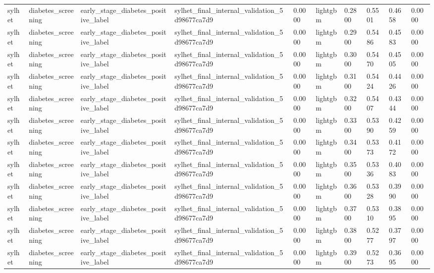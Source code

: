 \begin{tabular}{llllllllll}
sylhet & diabetes\_screening & early\_stage\_diabetes\_positive\_label & sylhet\_final\_internal\_validation\_5d98677ca7d9 & 0.0000 & lightgbm & 0.2800 & 0.5501 & 0.4658 & 0.0000 \\
sylhet & diabetes\_screening & early\_stage\_diabetes\_positive\_label & sylhet\_final\_internal\_validation\_5d98677ca7d9 & 0.0000 & lightgbm & 0.2900 & 0.5486 & 0.4583 & 0.0000 \\
sylhet & diabetes\_screening & early\_stage\_diabetes\_positive\_label & sylhet\_final\_internal\_validation\_5d98677ca7d9 & 0.0000 & lightgbm & 0.3000 & 0.5470 & 0.4505 & 0.0000 \\
sylhet & diabetes\_screening & early\_stage\_diabetes\_positive\_label & sylhet\_final\_internal\_validation\_5d98677ca7d9 & 0.0000 & lightgbm & 0.3100 & 0.5424 & 0.4426 & 0.0000 \\
sylhet & diabetes\_screening & early\_stage\_diabetes\_positive\_label & sylhet\_final\_internal\_validation\_5d98677ca7d9 & 0.0000 & lightgbm & 0.3200 & 0.5407 & 0.4344 & 0.0000 \\
sylhet & diabetes\_screening & early\_stage\_diabetes\_positive\_label & sylhet\_final\_internal\_validation\_5d98677ca7d9 & 0.0000 & lightgbm & 0.3300 & 0.5390 & 0.4259 & 0.0000 \\
sylhet & diabetes\_screening & early\_stage\_diabetes\_positive\_label & sylhet\_final\_internal\_validation\_5d98677ca7d9 & 0.0000 & lightgbm & 0.3400 & 0.5373 & 0.4172 & 0.0000 \\
sylhet & diabetes\_screening & early\_stage\_diabetes\_positive\_label & sylhet\_final\_internal\_validation\_5d98677ca7d9 & 0.0000 & lightgbm & 0.3500 & 0.5336 & 0.4083 & 0.0000 \\
sylhet & diabetes\_screening & early\_stage\_diabetes\_positive\_label & sylhet\_final\_internal\_validation\_5d98677ca7d9 & 0.0000 & lightgbm & 0.3600 & 0.5328 & 0.3990 & 0.0000 \\
sylhet & diabetes\_screening & early\_stage\_diabetes\_positive\_label & sylhet\_final\_internal\_validation\_5d98677ca7d9 & 0.0000 & lightgbm & 0.3700 & 0.5310 & 0.3895 & 0.0000 \\
sylhet & diabetes\_screening & early\_stage\_diabetes\_positive\_label & sylhet\_final\_internal\_validation\_5d98677ca7d9 & 0.0000 & lightgbm & 0.3800 & 0.5277 & 0.3797 & 0.0000 \\
sylhet & diabetes\_screening & early\_stage\_diabetes\_positive\_label & sylhet\_final\_internal\_validation\_5d98677ca7d9 & 0.0000 & lightgbm & 0.3900 & 0.5273 & 0.3695 & 0.0000 \\

\end{tabular}

